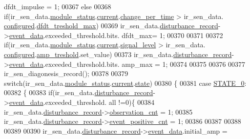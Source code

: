 \begin{DoxyCode}
      dfdt\_impulse = 1;
00367     \textcolor{keywordflow}{else}
00368     \textcolor{keywordflow}{if}(ir\_sen\_data.\hyperlink{a00023_a5a53c391562b059eb744ac679f3765ca}{module\_status}.\hyperlink{a00017_ab8af48cdbba92b3ae39c4470e53af944}{current}.\hyperlink{a00017_ad5c4f9a39d2a36632a53205ae8eb5a5d}{change\_per\_time}  > ir\_sen\_data.
      \hyperlink{a00023_a94b2d1f6ea4ab334c74d24984dd27843}{configured}.\hyperlink{a00021_adf9a37828e447378b1d533185213316d}{dfdt\_treshold\_max})
00369          ir\_sen\_data.\hyperlink{a00023_ac9b38e2c1d3f1013a88d33506c754152}{disturbance\_record}->\hyperlink{a00028_a8c0bda69e71ef674e60da47ad0be9ab0}{event\_data}.exceeded\_threshold.bits.
      dfdt\_max= 1;
00370 
00371 
00372     \textcolor{keywordflow}{if}(ir\_sen\_data.\hyperlink{a00023_a5a53c391562b059eb744ac679f3765ca}{module\_status}.\hyperlink{a00017_ab8af48cdbba92b3ae39c4470e53af944}{current}.\hyperlink{a00017_abcdf2bc0c2e5a14863938ae28c3bc96e}{signal\_level} > ir\_sen\_data.
      \hyperlink{a00023_a94b2d1f6ea4ab334c74d24984dd27843}{configured}.\hyperlink{a00021_a4b3bbfb0267daea1432f2603825ade62}{amp\_treshold}.set\_value)
00373         ir\_sen\_data.\hyperlink{a00023_ac9b38e2c1d3f1013a88d33506c754152}{disturbance\_record}->\hyperlink{a00028_a8c0bda69e71ef674e60da47ad0be9ab0}{event\_data}.exceeded\_threshold.bits.
      amp\_max = 1;
00374 
00375 
00376 
00377    ir\_sen\_diagonesis\_record();
00378                           
00379     \textcolor{keywordflow}{switch}(ir\_sen\_data.\hyperlink{a00023_a5a53c391562b059eb744ac679f3765ca}{module\_status}.\hyperlink{a00017_ab8af48cdbba92b3ae39c4470e53af944}{current}.\hyperlink{a00017_a6b8d8e916bc56265a3fd279bd26b6d1b}{state})
00380     \{
00381         \textcolor{keywordflow}{case} \hyperlink{a00021_ad6739dbbe5581cac99b7dc8a5e09949c}{STATE\_0}:
00382         \{
00383             \textcolor{keywordflow}{if}(ir\_sen\_data.\hyperlink{a00023_ac9b38e2c1d3f1013a88d33506c754152}{disturbance\_record}->\hyperlink{a00028_a8c0bda69e71ef674e60da47ad0be9ab0}{event\_data}.exceeded\_threshold.
      all !=0)\{
00384             ir\_sen\_data.\hyperlink{a00023_ac9b38e2c1d3f1013a88d33506c754152}{disturbance\_record}->\hyperlink{a00028_ad5b0bac02ce266b91b2b52a1c3ea1d78}{observation\_cnt}    = 1;
00385             ir\_sen\_data.\hyperlink{a00023_ac9b38e2c1d3f1013a88d33506c754152}{disturbance\_record}->\hyperlink{a00028_a7397b9d76d4b57500f27bb23d258a18a}{event\_positive\_cnt} = 1;
00386 
00387 
00388 
00389 
00390             ir\_sen\_data.\hyperlink{a00023_ac9b38e2c1d3f1013a88d33506c754152}{disturbance\_record}->\hyperlink{a00028_a8c0bda69e71ef674e60da47ad0be9ab0}{event\_data}.initial\_amp =

\end{DoxyCode}
